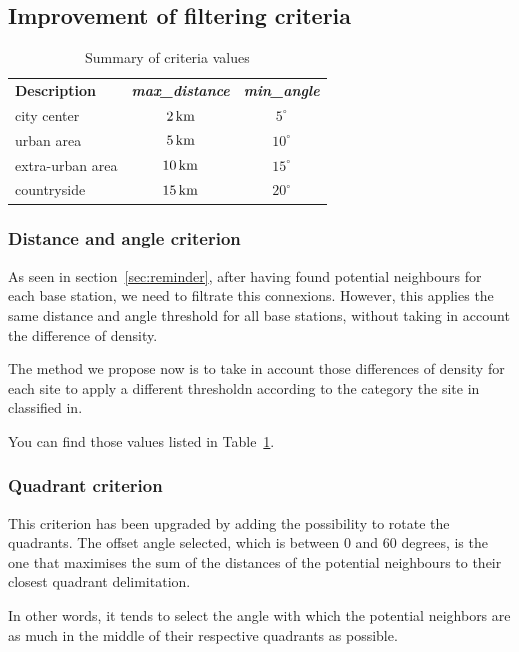 \documentclass[lettersize,journal,english]{IEEEtran}
\begin{document}
\subsection{Improvement of filtering criteria}
\begin{table}[!t]
    \centering
    \caption{Summary of criteria values}
    \label{table:crit_summary}
    \begin{tabular}{lcc}
        \toprule
        \textbf{Description} & \textbf{\emph{max\_distance}} & \textbf{\emph{min\_angle}} \\
        \cmidrule(lr){1-3}
        city center & $\unit[2]{km}$ & $5^\circ$ \\
        urban area & $\unit[5]{km}$ & $10^\circ$ \\
        extra-urban area & $\unit[10]{km}$ & $15^\circ$ \\
        countryside & $\unit[15]{km}$ & $20^\circ$ \\
        \bottomrule
    \end{tabular}
\end{table}

\subsubsection{Distance and angle criterion}
As seen in section~\ref{sec:reminder}, after having found potential neighbours for each base station,
we need to filtrate this connexions. However, this applies the same distance and angle threshold for all base stations, without taking in account the difference of density.

The method we propose now is to take in account those differences of density for each site to apply a different thresholdn according to the category the site in classified in.

You can find those values listed in Table~\ref{table:crit_summary}.

\subsubsection{Quadrant criterion}
This criterion has been upgraded by adding the possibility to rotate the quadrants. The offset angle selected, which is between $0$ and 
$60$ degrees, is the one that maximises the sum of the distances of the potential neighbours to their closest quadrant delimitation.

In other words, it tends to select the angle with which the potential neighbors are as much in the middle of their respective quadrants
as possible.
\end{document}
